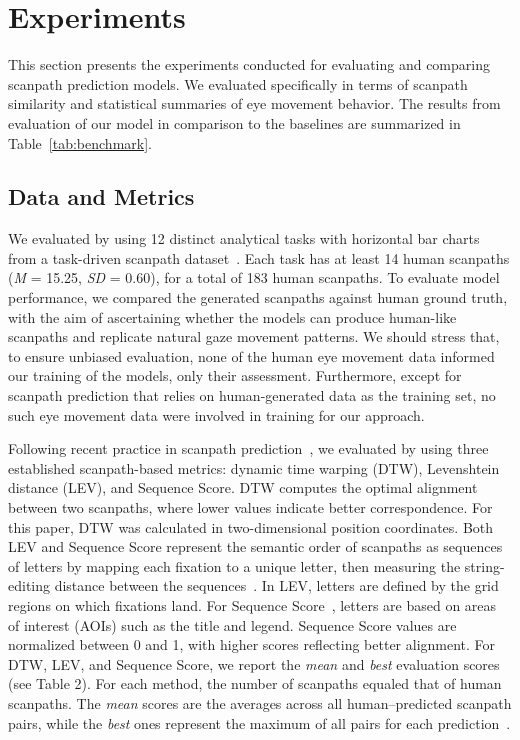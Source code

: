 \section{Experiments}
\label{sec:evaluation}

This section presents the experiments conducted for evaluating and comparing scanpath prediction models. We evaluated \name specifically in terms of scanpath similarity and statistical summaries of eye movement behavior. The results from evaluation of our model in comparison to the baselines are summarized in Table~\ref{tab:benchmark}.

\subsection{Data and Metrics}

We evaluated \name by using 12 distinct analytical tasks with horizontal bar charts from a task-driven scanpath dataset~\cite{polatsek2018exploring}. 
Each task has at least 14 human scanpaths (\textit{M} = 15.25, \textit{SD} = 0.60), for a total of 183 human scanpaths. 
To evaluate model performance, we compared the generated scanpaths against human ground truth, with the aim of ascertaining whether the models can produce human-like scanpaths and replicate natural gaze movement patterns. 
We should stress that, to ensure unbiased evaluation, none of the human eye movement data informed our training of the models, only their assessment.
Furthermore, except for scanpath prediction that relies on human-generated data as the training set, no such eye movement data were involved in training for our approach.

Following recent practice in scanpath prediction~\cite{wang2023scanpath, sui2023scandmm}, we evaluated \name by using three established scanpath-based metrics: dynamic time warping (DTW), Levenshtein distance (LEV), and Sequence Score.
DTW computes the optimal alignment between two scanpaths, where lower values indicate better correspondence. For this paper, DTW was calculated in two-dimensional position coordinates.
Both LEV and Sequence Score represent the semantic order of scanpaths as sequences of letters by mapping each fixation to a unique letter, then measuring the string-editing distance between the sequences~\cite{needleman1970general}. 
In LEV, letters are defined by the grid regions on which fixations land. 
For Sequence Score~\cite{yang2020predicting, wang2023scanpath}, letters are based on areas of interest (AOIs) such as the title and legend.
Sequence Score values are normalized between 0 and 1, with higher scores reflecting better alignment.
For DTW, LEV, and Sequence Score, we report the \textit{mean} and \textit{best} evaluation scores (see Table 2). For each method, the number of scanpaths equaled that of human scanpaths. The \textit{mean} scores are the averages across all human--predicted scanpath pairs, while the \textit{best} ones represent the maximum of all pairs for each prediction~\cite{chen2021predicting, wang2023scanpath}.

